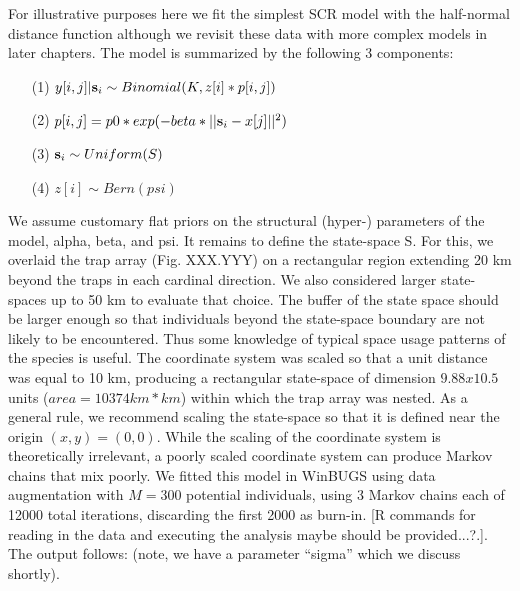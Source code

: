For illustrative purposes here we fit the simplest SCR model with the half-normal distance function although we revisit these data with more complex models in later chapters. The model is summarized by the following 3 components: 
\begin{itemize}
\item[(1)] $y[i,j]|{\bf s}_{i} \sim Binomial(K, z[i]*p[i,j])$
\item[(2)] $p[i,j] = p0*exp(-beta*||{\bf s}_{i}-x[j]||^2)$
\item[(3)] $ {\bf s}_{i} \sim Uniform(S)$
\item[(4)] $ z[i] \sim Bern(psi)	$
\end{itemize}		
We assume customary flat priors on the structural (hyper-) parameters of the model, alpha, beta, and psi.  It remains to define the state-space S. For this, we overlaid the trap array (Fig. XXX.YYY) on a rectangular region extending 20 km beyond the traps in each cardinal direction.  We also considered larger state-spaces up to 50 km to evaluate that choice.
The buffer of the state space should be larger enough so that individuals beyond the state-space boundary are not likely to be encountered. Thus some knowledge of typical space usage patterns of the species is useful.
The coordinate system was scaled so that a unit distance was equal to 10 km, producing a rectangular state-space of dimension $9.88 x 10.5$ units ($area = 10374 km*km$) within which the trap array was nested. As a general rule, we recommend scaling the state-space so that it is defined near the origin $(x,y)=(0,0)$. While the scaling of the coordinate system is theoretically irrelevant, a poorly scaled coordinate system can produce Markov chains that mix poorly.  
We fitted this model in WinBUGS using data augmentation with $M=300$ potential individuals, using 3 Markov chains each of 12000 total iterations, discarding the first 2000 as burn-in.  [R commands for reading in the data and executing the analysis maybe should be provided...?.]. The output follows: (note, we have a parameter ``sigma'' which we discuss shortly).

